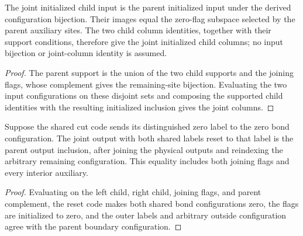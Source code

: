 \begin{lemma}
    \label{thm:mpu_actual_input_regrouping}
    \leanok
    The joint initialized child input is the parent initialized input under
    the derived configuration bijection. Their images equal the zero-flag subspace
    selected by the parent auxiliary sites. The two child column identities,
    together with their support conditions, therefore give the joint initialized
    child columns; no input bijection or joint-column identity is assumed.
\end{lemma}
\begin{proof}\leanok
    The parent support is the union of the two child supports and the joining
    flags, whose complement gives the remaining-site bijection. Evaluating the two
    input configurations on these disjoint sets and composing the supported child
    identities with the resulting initialized inclusion gives the joint columns.
\end{proof}

\begin{lemma}
    \label{thm:mpu_actual_output_reset}
    \leanok
    Suppose the shared cut code sends its distinguished zero label to the zero
    bond configuration. The joint output with both shared labels reset to
    that label is the parent output inclusion, after joining the physical
    outputs and reindexing the arbitrary remaining configuration. This equality
    includes both joining flags and every interior auxiliary.
\end{lemma}
\begin{proof}\leanok
    Evaluating on the left child, right child, joining flags, and parent complement,
    the reset code makes both shared bond configurations zero, the flags are
    initialized to zero, and the outer labels and arbitrary outside configuration
    agree with the parent boundary configuration.
\end{proof}

